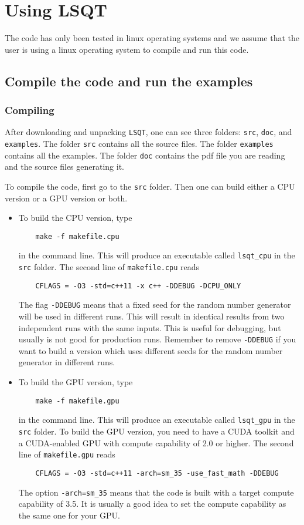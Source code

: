 \documentclass[12pt,a4paper]{report}
\begin{document}
\chapter{Using LSQT \label{section:usage}}

The code has only been tested in linux operating systems and we assume that the user is using a linux operating system to compile and run this code.

\section{Compile the code and run the examples}

\subsection{Compiling}

After downloading and unpacking \verb"LSQT", one can see three folders:  \verb"src",  \verb"doc", and \verb"examples". The folder \verb"src" contains all the source files. The folder \verb"examples" contains all the examples. The folder \verb"doc" contains the pdf file you are reading and the source files generating it.

To compile the code, first go to the \verb"src" folder. Then one can build either a CPU version or a GPU version or both. 
\begin{itemize}
\item To build the CPU version, type
\begin{verbatim}
    make -f makefile.cpu
\end{verbatim}
in the command line. This will produce an executable called \verb"lsqt_cpu" in the \verb"src" folder. The second line of \verb"makefile.cpu" reads
\begin{verbatim}
    CFLAGS = -O3 -std=c++11 -x c++ -DDEBUG -DCPU_ONLY
\end{verbatim}
The flag \verb"-DDEBUG" means that a fixed seed for the random number generator will be used in different runs. This will result in identical results from two independent runs with the same inputs. This is useful for debugging, but usually is not good for production runs. Remember to remove \verb"-DDEBUG" if you want to build a version which uses different seeds for the random number generator in different runs. 
\item To build the GPU version, type 
\begin{verbatim}
    make -f makefile.gpu
\end{verbatim}
in the command line. This will produce an executable called \verb"lsqt_gpu" in the \verb"src" folder. To build the GPU version, you need to have a CUDA toolkit and a CUDA-enabled GPU with compute capability of 2.0 or higher. The second line of \verb"makefile.gpu" reads
\begin{verbatim}
    CFLAGS = -O3 -std=c++11 -arch=sm_35 -use_fast_math -DDEBUG
\end{verbatim}
The option \verb"-arch=sm_35" means that the code is built with a target compute capability of 3.5. It is usually a good idea to set the compute capability as the same one for your GPU.
\end{itemize}
\end{document}
